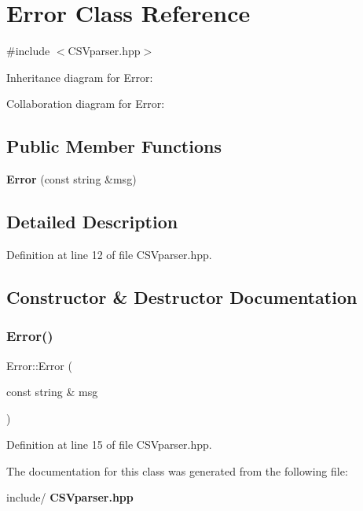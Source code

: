 \section{Error Class Reference}
\label{class_error}


{\ttfamily \#include $<$C\+S\+Vparser.\+hpp$>$}



Inheritance diagram for Error\+:


Collaboration diagram for Error\+:
\subsection*{Public Member Functions}
\begin{DoxyCompactItemize}
\item 
\textbf{ Error} (const string \&msg)
\end{DoxyCompactItemize}


\subsection{Detailed Description}


Definition at line 12 of file C\+S\+Vparser.\+hpp.



\subsection{Constructor \& Destructor Documentation}
\mbox{\label{class_error_af330fc77babbadebc9a12b3aabfe146f}} 
\subsubsection{Error()}
{\footnotesize\ttfamily Error\+::\+Error (\begin{DoxyParamCaption}\item[{const string \&}]{msg }\end{DoxyParamCaption})\hspace{0.3cm}{\ttfamily [inline]}}



Definition at line 15 of file C\+S\+Vparser.\+hpp.



The documentation for this class was generated from the following file\+:\begin{DoxyCompactItemize}
\item 
include/\textbf{ C\+S\+Vparser.\+hpp}\end{DoxyCompactItemize}
